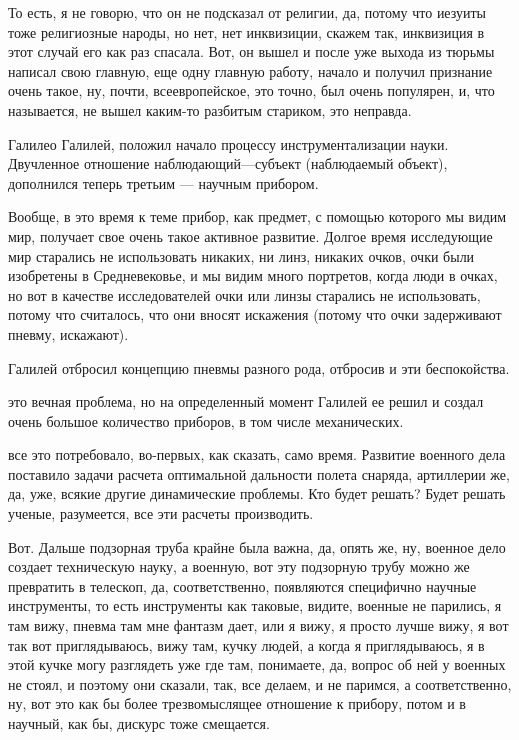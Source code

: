 То есть, я не говорю, что он не подсказал
от религии, да, потому что иезуиты тоже религиозные народы, но нет, нет
инквизиции, скажем так, инквизиция в этот случай его как раз спасала. Вот, он
вышел и после уже выхода из тюрьмы написал свою главную, еще одну главную
работу, начало и получил признание очень такое, ну, почти, всеевропейское, это
точно, был очень популярен, и, что называется, не вышел каким-то разбитым
стариком, это неправда. 

Галилео Галилей, положил начало процессу
инструментализации науки. 
Двучленное отношение наблюдающий---субъект (наблюдаемый объект), дополнился теперь третьим --- научным прибором. 

Вообще, в это время к теме прибор, как предмет, с помощью которого мы
видим мир, получает свое очень такое активное развитие. Долгое время исследующие мир старались не использовать никаких, ни линз,
никаких очков, очки были изобретены в Средневековье, и мы видим много портретов,
когда люди в очках, но вот в качестве исследователей очки или линзы старались не
использовать, потому что считалось, что они вносят искажения (потому что
очки задерживают пневму, искажают).


Галилей отбросил концепцию пневмы разного рода,
отбросив и эти беспокойства. 


это вечная
проблема, но на определенный момент Галилей ее решил и создал очень большое
количество приборов, в том числе механических. 

все это потребовало, во-первых,
как сказать, само время. Развитие военного дела поставило задачи расчета
оптимальной дальности полета снаряда, артиллерии же, да, уже, всякие другие
динамические проблемы. Кто будет решать? Будет решать ученые, разумеется, все
эти расчеты производить. 

Вот. Дальше подзорная труба крайне была важна, да,
опять же, ну, военное дело создает техническую науку, а военную, вот эту
подзорную трубу можно же превратить в телескоп, да, соответственно, появляются
специфично научные инструменты, то есть инструменты как таковые, видите, военные
не парились, я там вижу, пневма там мне фантазм дает, или я вижу, я просто лучше
вижу, я вот так вот приглядываюсь, вижу там, кучку людей, а когда я
приглядываюсь, я в этой кучке могу разглядеть уже где там, понимаете, да, вопрос
об ней у военных не стоял, и поэтому они сказали, так, все делаем, и не паримся,
а соответственно, ну, вот это как бы более трезвомыслящее отношение к прибору,
потом и в научный, как бы, дискурс тоже смещается. 

